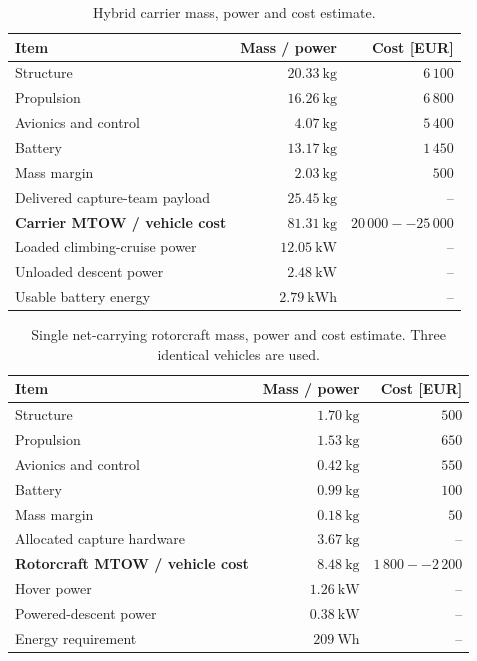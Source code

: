 \begin{table}[H]
\centering
\small
\caption{Hybrid carrier mass, power and cost estimate.}
\label{tab:conceptB_carrier_compact}
\begin{tabular}{lrr}
\hline
\textbf{Item} & \textbf{Mass / power} & \textbf{Cost [EUR]} \\
\hline
Structure & $20.33~\mathrm{kg}$ & $6\,100$ \\
Propulsion & $16.26~\mathrm{kg}$ & $6\,800$ \\
Avionics and control & $4.07~\mathrm{kg}$ & $5\,400$ \\
Battery & $13.17~\mathrm{kg}$ & $1\,450$ \\
Mass margin & $2.03~\mathrm{kg}$ & $500$ \\
Delivered capture-team payload & $25.45~\mathrm{kg}$ & -- \\
\hline
\textbf{Carrier MTOW / vehicle cost} & \textbf{$81.31~\mathrm{kg}$} & \textbf{$20\,000--25\,000$} \\
\hline
Loaded climbing-cruise power & $12.05~\mathrm{kW}$ & -- \\
Unloaded descent power & $2.48~\mathrm{kW}$ & -- \\
Usable battery energy & $2.79~\mathrm{kWh}$ & -- \\
\hline
\end{tabular}
\end{table}

\begin{table}[H]
\centering
\small
\caption{Single net-carrying rotorcraft mass, power and cost estimate. Three identical vehicles are used.}
\label{tab:conceptB_rotorcraft_compact}
\begin{tabular}{lrr}
\hline
\textbf{Item} & \textbf{Mass / power} & \textbf{Cost [EUR]} \\
\hline
Structure & $1.70~\mathrm{kg}$ & $500$ \\
Propulsion & $1.53~\mathrm{kg}$ & $650$ \\
Avionics and control & $0.42~\mathrm{kg}$ & $550$ \\
Battery & $0.99~\mathrm{kg}$ & $100$ \\
Mass margin & $0.18~\mathrm{kg}$ & $50$ \\
Allocated capture hardware & $3.67~\mathrm{kg}$ & -- \\
\hline
\textbf{Rotorcraft MTOW / vehicle cost} & \textbf{$8.48~\mathrm{kg}$} & \textbf{$1\,800--2\,200$} \\
\hline
Hover power & $1.26~\mathrm{kW}$ & -- \\
Powered-descent power & $0.38~\mathrm{kW}$ & -- \\
Energy requirement & $209~\mathrm{Wh}$ & -- \\
\hline
\end{tabular}
\end{table}

